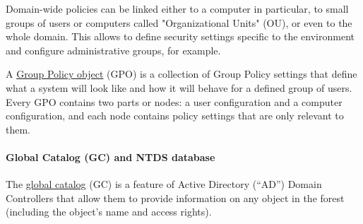 Domain-wide policies can be linked either to a computer in particular, to small groups of users or computers called "Organizational Units" (OU), or even to the whole domain. This allows to define security settings specific to the environment and configure administrative groups, for example.

A \underline{Group Policy object} (GPO) is a collection of Group Policy settings that define what a system will look like and how it will behave for a defined group of users. Every GPO contains two parts or nodes: a user configuration and a computer configuration, and each node contains policy settings that are only relevant to them.






\paragraph{Global Catalog (GC) and NTDS database}
The \underline{global catalog} (GC) is a feature of Active Directory (“AD”) Domain Controllers that allow them to provide information on any object in the forest (including the object's name and access rights).

